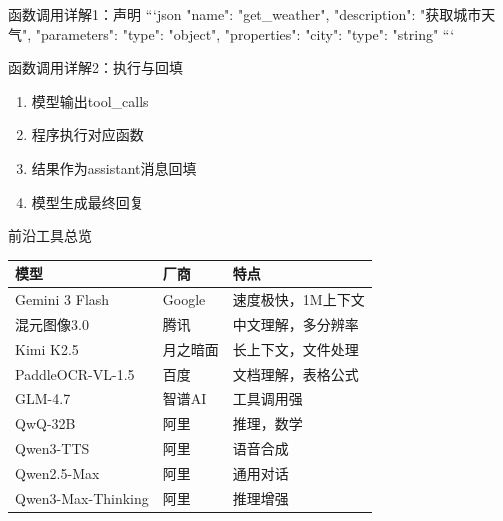 \begin{frame}{函数调用详解1：声明}
```json
{
  "name": "get_weather",
  "description": "获取城市天气",
  "parameters": {
    "type": "object",
    "properties": {
      "city": {"type": "string"}
    }
  }
}
```

\end{frame}
\begin{frame}{函数调用详解2：执行与回填}
\begin{enumerate}
\item 模型输出tool\_calls
\item 程序执行对应函数
\item 结果作为assistant消息回填
\item 模型生成最终回复
\end{enumerate}
\end{frame}

\begin{frame}{前沿工具总览}
\begin{table}
\small
\begin{tabular}{lll}
\toprule
模型 & 厂商 & 特点 \\
\midrule
Gemini 3 Flash & Google & 速度极快，1M上下文 \\
混元图像3.0 & 腾讯 & 中文理解，多分辨率 \\
Kimi K2.5 & 月之暗面 & 长上下文，文件处理 \\
PaddleOCR-VL-1.5 & 百度 & 文档理解，表格公式 \\
GLM-4.7 & 智谱AI & 工具调用强 \\
QwQ-32B & 阿里 & 推理，数学 \\
Qwen3-TTS & 阿里 & 语音合成 \\
Qwen2.5-Max & 阿里 & 通用对话 \\
Qwen3-Max-Thinking & 阿里 & 推理增强 \\
\bottomrule
\end{tabular}
\end{table}
\end{frame}

